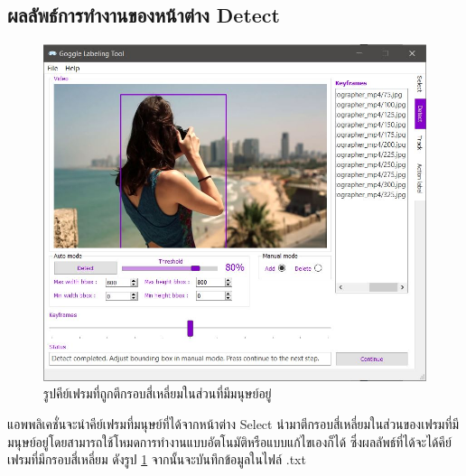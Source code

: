 \subsection*{ผลลัพธ์การทำงานของหน้าต่าง Detect}
\begin{figure}[!ht]
  \centering
    \includegraphics[scale=0.60]{chapter4/images/Result/result_select4.jpg}
    \caption{รูปคีย์เฟรมที่ถูกตีกรอบสี่เหลี่ยมในส่วนที่มีมนุษย์อยู่}
    \label{fig:result_detect}
\end{figure}
\clearpage
แอพพลิเคชั่นจะนำคีย์เฟรมที่มนุษย์ที่ได้จากหน้าต่าง Select นำมาตีกรอบสี่เหลี่ยมในส่วนของเฟรมที่มีมนุษย์อยู่โดยสามารถใช้โหมดการทำงานแบบอัตโนมัติหรือแบบแก้ไขเองก็ได้ ซึ่งผลลัพธ์ที่ได้จะได้คีย์เฟรมที่มีกรอบสี่เหลี่ยม ดังรูป \ref{fig:result_detect} จากนั้นจะบันทึกข้อมูลในไฟล์ .txt 

